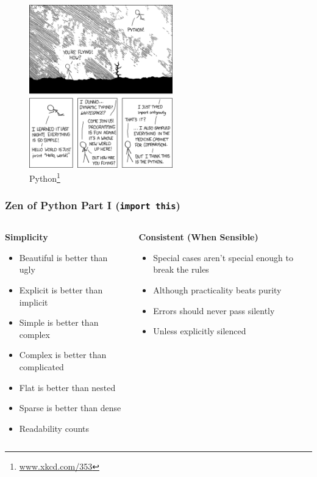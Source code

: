 \documentclass{beamer}
\begin{document}
\begin{frame}
\begin{figure}
  \begin{center}
    \includegraphics[height=200pt,keepaspectratio]{xkcd_python.png}
    \caption
    {
      Python\footnote{\url{www.xkcd.com/353}} 
    }
    \end{center}
  \end{figure}
\end{frame}
 
\begin{frame}
 \frametitle{Zen of Python Part I (\texttt{import this})}
 \begin{columns}
   \begin{column}{0.53\textwidth}
   \textbf{Simplicity}
   \begin{itemize}
     \item Beautiful is better than ugly
     \item Explicit is better than implicit
     \item Simple is better than complex
     \item Complex is better than complicated
     \item Flat is better than nested
     \item Sparse is better than dense
     \item Readability counts
   \end{itemize}
 \end{column}
      
 \begin{column}{0.47\textwidth}
   \textbf{Consistent (When Sensible)}
    \begin{itemize}
      \item Special cases aren't special enough to break the rules
      \item Although practicality beats purity
      \item Errors should never pass silently
      \item Unless explicitly silenced
    \end{itemize}
 \end{column}
 \end{columns}
\end{frame}
\end{document}
